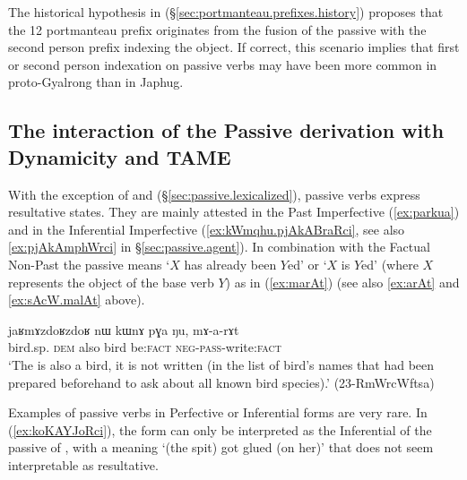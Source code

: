 The historical hypothesis in (§\ref{sec:portmanteau.prefixes.history}) proposes that the 1\fl{}2 portmanteau prefix  originates from the fusion of  the passive  with the second person  prefix indexing the object. If correct, this scenario implies that first or second person indexation on passive verbs may have been more common in proto-Gyalrong than in Japhug.

\subsection{The interaction of the Passive derivation with Dynamicity and TAME} \label{sec:passive.stative} 
With the exception of   and   (§\ref{sec:passive.lexicalized}), passive verbs express resultative states. They are mainly attested in the Past Imperfective (\ref{ex:parkua}) and in the Inferential Imperfective (\ref{ex:kWmqhu.pjAkABraRci}, see also \ref{ex:pjAkAmphWrci} in §\ref{sec:passive.agent}). In combination with the Factual Non-Past the passive means `$X$ has already been $Y$ed' or `$X$ is $Y$ed' (where $X$ represents the object of the base verb $Y$) as in (\ref{ex:marAt}) (see also \ref{ex:arAt} and \ref{ex:sAcW.malAt} above).

\begin{exe}
\ex \label{ex:marAt}
 \gll  jaʁmɤzdoʁzdoʁ nɯ kɯnɤ pɣa ŋu, mɤ-a-rɤt \\
 bird.sp. \textsc{dem} also bird be:\textsc{fact} \textsc{neg}-\textsc{pass}-write:\textsc{fact} \\
 \glt `The  is also a bird, it is not written (in the list of bird's names that had been prepared beforehand to ask about all known bird species).' (23-RmWrcWftsa) 
\end{exe}

 Examples of passive verbs in Perfective or Inferential forms are very rare. In (\ref{ex:koKAYJoRci}), the form  can only be interpreted as the Inferential of the passive of , with a meaning `(the spit) got glued (on her)' that does not seem interpretable as resultative.
 
